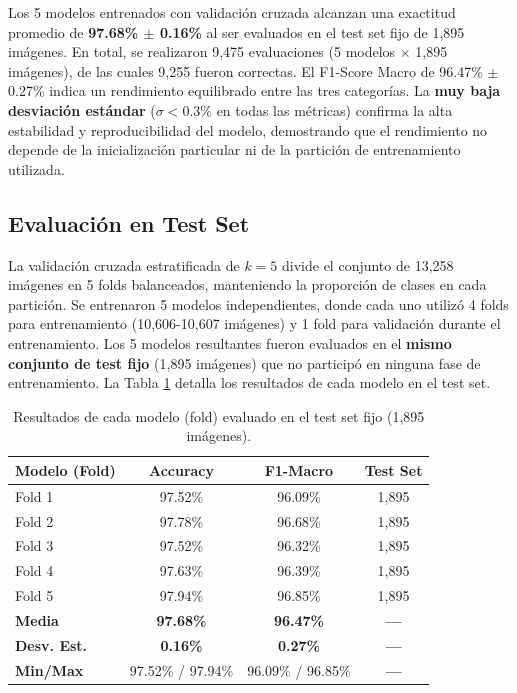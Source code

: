 Los 5 modelos entrenados con validación cruzada alcanzan una exactitud promedio de \textbf{97.68\% $\pm$ 0.16\%} al ser evaluados en el test set fijo de 1,895 imágenes. En total, se realizaron 9,475 evaluaciones (5 modelos $\times$ 1,895 imágenes), de las cuales 9,255 fueron correctas. El F1-Score Macro de 96.47\% $\pm$ 0.27\% indica un rendimiento equilibrado entre las tres categorías. La \textbf{muy baja desviación estándar} ($\sigma < 0.3\%$ en todas las métricas) confirma la alta estabilidad y reproducibilidad del modelo, demostrando que el rendimiento no depende de la inicialización particular ni de la partición de entrenamiento utilizada.

\subsection{Evaluación en Test Set}
\label{subsec:validacion_cruzada}

La validación cruzada estratificada de $k=5$ divide el conjunto de 13,258 imágenes en 5 folds balanceados, manteniendo la proporción de clases en cada partición. Se entrenaron 5 modelos independientes, donde cada uno utilizó 4 folds para entrenamiento (10,606-10,607 imágenes) y 1 fold para validación durante el entrenamiento. Los 5 modelos resultantes fueron evaluados en el \textbf{mismo conjunto de test fijo} (1,895 imágenes) que no participó en ninguna fase de entrenamiento. La Tabla \ref{tab:resultados_clasificacion_cv} detalla los resultados de cada modelo en el test set.

\begin{table}[htbp]
    \centering
    \caption{Resultados de cada modelo (fold) evaluado en el test set fijo (1,895 imágenes).}
    \label{tab:resultados_clasificacion_cv}
    \small
    \begin{tabular}{@{}lccc@{}}
        \toprule
        \textbf{Modelo (Fold)} & \textbf{Accuracy} & \textbf{F1-Macro} & \textbf{Test Set} \\
        \midrule
        Fold 1 & 97.52\% & 96.09\% & 1,895 \\
        Fold 2 & 97.78\% & 96.68\% & 1,895 \\
        Fold 3 & 97.52\% & 96.32\% & 1,895 \\
        Fold 4 & 97.63\% & 96.39\% & 1,895 \\
        Fold 5 & 97.94\% & 96.85\% & 1,895 \\
        \midrule
        \textbf{Media} & \textbf{97.68\%} & \textbf{96.47\%} & \textbf{---} \\
        \textbf{Desv. Est.} & \textbf{0.16\%} & \textbf{0.27\%} & \textbf{---} \\
        \textbf{Min/Max} & 97.52\% / 97.94\% & 96.09\% / 96.85\% & \textbf{---} \\
        \bottomrule
    \end{tabular}
\end{table}

